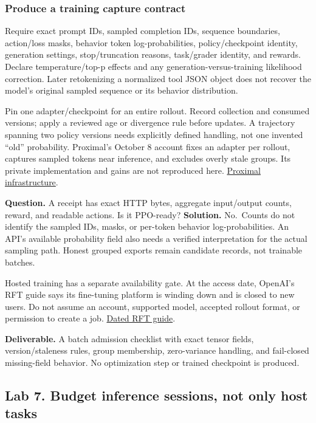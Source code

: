 \documentclass[
  11pt,
  letterpaper,
]{article}
\begin{document}
\subsubsection{Produce a training capture
contract}\label{produce-a-training-capture-contract}

Require exact prompt IDs, sampled completion IDs, sequence boundaries,
action/loss masks, behavior token log-probabilities, policy/checkpoint
identity, generation settings, stop/truncation reasons, task/grader
identity, and rewards. Declare temperature/top-p effects and any
generation-versus-training likelihood correction. Later retokenizing a
normalized tool JSON object does not recover the model's original
sampled sequence or its behavior distribution.

Pin one adapter/checkpoint for an entire rollout. Record collection and
consumed versions; apply a reviewed age or divergence rule before
updates. A trajectory spanning two policy versions needs explicitly
defined handling, not one invented ``old'' probability. Proximal's
October 8 account fixes an adapter per rollout, captures sampled tokens
near inference, and excludes overly stale groups. Its private
implementation and gains are not reproduced here.
\href{https://www.proximal.so/blog/posttraining-infra/}{Proximal
infrastructure}.

\textbf{Question.} A receipt has exact HTTP bytes, aggregate
input/output counts, reward, and readable actions. Is it PPO-ready?
\textbf{Solution.} No.~Counts do not identify the sampled IDs, masks, or
per-token behavior log-probabilities. An API's available probability
field also needs a verified interpretation for the actual sampling path.
Honest grouped exports remain candidate records, not trainable batches.

Hosted training has a separate availability gate. At the access date,
OpenAI's RFT guide says its fine-tuning platform is winding down and is
closed to new users. Do not assume an account, supported model, accepted
rollout format, or permission to create a job.
\href{https://developers.openai.com/api/docs/guides/reinforcement-fine-tuning}{Dated
RFT guide}.

\textbf{Deliverable.} A batch admission checklist with exact tensor
fields, version/staleness rules, group membership, zero-variance
handling, and fail-closed missing-field behavior. No optimization step
or trained checkpoint is produced.

\subsection{Lab 7. Budget inference sessions, not only host
tasks}\label{lab-7.-budget-inference-sessions-not-only-host-tasks}
\end{document}
